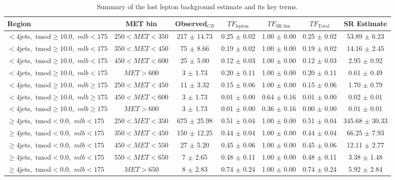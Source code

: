 \begin{table}
\centering
\small
\caption{Summary of the lost lepton background estimate and its key terms.}
\label{tab:stop:lostlep:results}
\begin{tabular}{|l|c|c|c|c|c|c|} \hline
Region & MET bin & Observed$_{CR}$ & $TF_\text{lepton}$ & $TF_\text{SR bin}$ & $TF_\text{Total}$ & SR Estimate \\ \hline \hline
 $<4$jets,~tmod$\ge10.0$,~$mlb<175$ & $250<MET<350$  & 217 $\pm$ 14.73  & 0.25 $\pm$ 0.02  & 1.00 $\pm$ 0.00 & 0.25 $\pm$ 0.02  & 53.89 $\pm$ 6.23  \\
 $<4$jets,~tmod$\ge10.0$,~$mlb<175$ & $350<MET<450$  & 75 $\pm$ 8.66  & 0.19 $\pm$ 0.02  & 1.00 $\pm$ 0.00 & 0.19 $\pm$ 0.02  & 14.16 $\pm$ 2.45  \\
 $<4$jets,~tmod$\ge10.0$,~$mlb<175$ & $450<MET<600$  & 25 $\pm$ 5.00  & 0.12 $\pm$ 0.03  & 1.00 $\pm$ 0.00 & 0.12 $\pm$ 0.03  & 2.95 $\pm$ 0.92  \\
 $<4$jets,~tmod$\ge10.0$,~$mlb<175$ & $MET>600$  & 3 $\pm$ 1.73  & 0.20 $\pm$ 0.11  & 1.00 $\pm$ 0.00 & 0.20 $\pm$ 0.11  & 0.61 $\pm$ 0.49  \\
\hline
 $<4$jets,~tmod$\ge10.0$,~$mlb\ge175$ & $250<MET<450$  & 11 $\pm$ 3.32  & 0.15 $\pm$ 0.06  & 1.00 $\pm$ 0.00 & 0.15 $\pm$ 0.06  & 1.70 $\pm$ 0.79  \\
 $<4$jets,~tmod$\ge10.0$,~$mlb\ge175$ & $450<MET<600$  & 3 $\pm$ 1.73  & 0.01 $\pm$ 0.00  & 0.64 $\pm$ 0.16 & 0.01 $\pm$ 0.00  & 0.02 $\pm$ 0.01  \\
 $<4$jets,~tmod$\ge10.0$,~$mlb\ge175$ & $MET>600$  & 3 $\pm$ 1.73  & 0.01 $\pm$ 0.00  & 0.36 $\pm$ 0.16 & 0.00 $\pm$ 0.00  & 0.01 $\pm$ 0.01  \\
\hline
 $\ge4$jets,~tmod$<0.0$,~$mlb<175$ & $250<MET<350$  & 675 $\pm$ 25.98  & 0.51 $\pm$ 0.04  & 1.00 $\pm$ 0.00 & 0.51 $\pm$ 0.04  & 345.68 $\pm$ 30.33  \\
 $\ge4$jets,~tmod$<0.0$,~$mlb<175$ & $350<MET<450$  & 150 $\pm$ 12.25  & 0.44 $\pm$ 0.04  & 1.00 $\pm$ 0.00 & 0.44 $\pm$ 0.04  & 66.25 $\pm$ 7.93  \\
 $\ge4$jets,~tmod$<0.0$,~$mlb<175$ & $450<MET<550$  & 27 $\pm$ 5.20  & 0.45 $\pm$ 0.06  & 1.00 $\pm$ 0.00 & 0.45 $\pm$ 0.06  & 12.11 $\pm$ 2.77  \\
 $\ge4$jets,~tmod$<0.0$,~$mlb<175$ & $550<MET<650$  & 7 $\pm$ 2.65  & 0.48 $\pm$ 0.11  & 1.00 $\pm$ 0.00 & 0.48 $\pm$ 0.11  & 3.38 $\pm$ 1.48  \\
 $\ge4$jets,~tmod$<0.0$,~$mlb<175$ & $MET>650$  & 8 $\pm$ 2.83  & 0.74 $\pm$ 0.24  & 1.00 $\pm$ 0.00 & 0.74 $\pm$ 0.24  & 5.92 $\pm$ 2.84  \\

\end{tabular}
\end{table}
